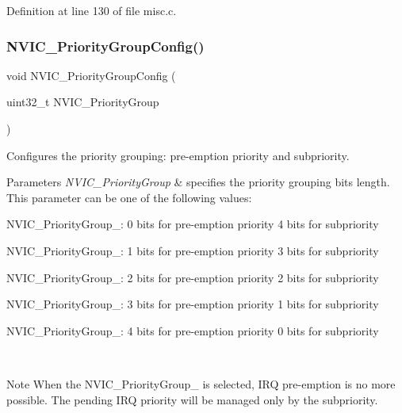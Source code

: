 Definition at line 130 of file misc.\+c.

\mbox{\label{group___m_i_s_c___private___functions_gadfb1f34f803ce54c976643db8c484442}} 
\subsubsection{\texorpdfstring{N\+V\+I\+C\+\_\+\+Priority\+Group\+Config()}{NVIC\_PriorityGroupConfig()}}
{\footnotesize\ttfamily void N\+V\+I\+C\+\_\+\+Priority\+Group\+Config (\begin{DoxyParamCaption}\item[{uint32\+\_\+t}]{N\+V\+I\+C\+\_\+\+Priority\+Group }\end{DoxyParamCaption})}



Configures the priority grouping\+: pre-\/emption priority and subpriority. 


\begin{DoxyParams}{Parameters}
{\em N\+V\+I\+C\+\_\+\+Priority\+Group} & specifies the priority grouping bits length. This parameter can be one of the following values\+: \begin{DoxyItemize}
\item N\+V\+I\+C\+\_\+\+Priority\+Group\+\_\+: 0 bits for pre-\/emption priority 4 bits for subpriority \item N\+V\+I\+C\+\_\+\+Priority\+Group\+\_\+: 1 bits for pre-\/emption priority 3 bits for subpriority \item N\+V\+I\+C\+\_\+\+Priority\+Group\+\_\+: 2 bits for pre-\/emption priority 2 bits for subpriority \item N\+V\+I\+C\+\_\+\+Priority\+Group\+\_\+: 3 bits for pre-\/emption priority 1 bits for subpriority \item N\+V\+I\+C\+\_\+\+Priority\+Group\+\_\+: 4 bits for pre-\/emption priority 0 bits for subpriority \end{DoxyItemize}
\\
\hline
\end{DoxyParams}
\begin{DoxyNote}{Note}
When the N\+V\+I\+C\+\_\+\+Priority\+Group\+\_ is selected, I\+RQ pre-\/emption is no more possible. The pending I\+RQ priority will be managed only by the subpriority. 
\end{DoxyNote}

